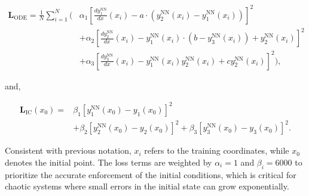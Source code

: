 \begin{equation}\label{eq:dbc_19}
\begin{aligned}
\mathbf{L}_{\mathrm{ODE}}=\frac{1}{N}\sum_{i=1}^N\Bigg(&\alpha_1\left[\frac{dy_1^{\mathrm{NN}}}{dx}(x_i)-a\cdot\left(y_2^{\mathrm{NN}}(x_i)-y_1^{\mathrm{NN}}(x_i)\right)\right]^2\\
&+\alpha_2\left[\frac{dy_2^{\mathrm{NN}}}{dx}(x_i)-y_1^{\mathrm{NN}}(x_i)\cdot\left(b-y_3^{\mathrm{NN}}(x_i)\right)+y_2^{\mathrm{NN}}(x_i)\right]^2\\
&+\alpha_3\left[\frac{dy_3^{\mathrm{NN}}}{dx}(x_i)-y_1^{\mathrm{NN}}(x_i)y_2^{\mathrm{NN}}(x_i)+cy_2^{\mathrm{NN}}(x_i)\right]^2\Bigg),
\end{aligned}
\end{equation}




and,

\begin{equation}\label{eq:dbc_20}
\begin{aligned}\mathbf{L}_{\mathrm{IC}}(x_0)={}&\beta_1\left[y_1^{\mathrm{NN}}(x_0)-y_1(x_0)\right]^2\\&+\beta_2\left[y_2^{\mathrm{NN}}(x_0)-y_2(x_0)\right]^2+\beta_3\left[y_3^{\mathrm{NN}}(x_0)-y_3(x_0)\right]^2.\end{aligned}
\end{equation}

Consistent with previous notation, $x_i$ refers to the training coordinates, while $x_0$ denotes the initial point. The loss terms are weighted by $\alpha_i = 1$ and $\beta_i = 6000$ to prioritize the accurate enforcement of the initial conditions, which is critical for chaotic systems where small errors in the initial state can grow exponentially.

